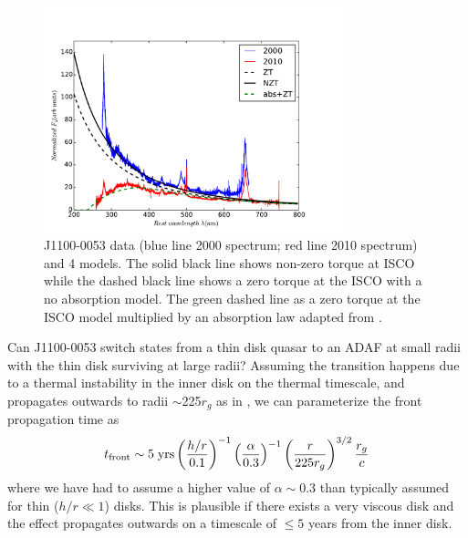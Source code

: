 \documentclass[a4paper,fleqn,usenatbib]{mnras}
\begin{document}
{\begin{figure}
  \centering
\includegraphics[width=8.7cm, trim=0.2cm 0.2cm 1.4cm 0.6cm, clip]
{../plots/models/mcd_gap_v3_3_b1.pdf}
\vspace{-12pt}
  \caption[]{
J1100-0053 data (blue line 2000 spectrum; red line 2010 spectrum) and
4 models. The solid black line shows non-zero torque at ISCO
\citep[following] []{Afshordi_Paczynski2003} while the
dashed black line shows a zero torque at the ISCO with a no absorption model. 
The green dashed line as a zero torque at the ISCO model multiplied by an 
absorption law adapted from \citep{Guo2016}.   }
  \label{fig:disk_suppression}
\end{figure}
Can J1100-0053 switch states from a thin disk quasar to an ADAF at
small radii with the thin disk surviving at large radii?
Assuming the transition happens due to a thermal instability in the
inner disk on the thermal timescale, and propagates outwards to radii
$\sim$225$r_{g}$ as in \citet{Nemmen2006}, we can parameterize the
front propagation time as
\begin{equation}
    t_{\rm front}  \sim  5 \; {\rm yrs} \left(\frac{h/r}{0.1}\right)^{-1}
                                                           \left(\frac{\alpha}{0.3}\right)^{-1}  
                                                           \left(\frac{r}{225r_{g}}\right)^{3/2}  
                                                           \frac{r_{g}}{c}
\label{eqn:t_front}
\end{equation}
where we have had to assume a higher value of $\alpha \sim 0.3$
\citep{King2007} than typically assumed for thin ($h/r \ll 1$)
disks. This is plausible if there exists a very viscous disk and the
effect propagates outwards on a timescale of $\leq 5$ years from the
inner disk.

}
\end{document}
